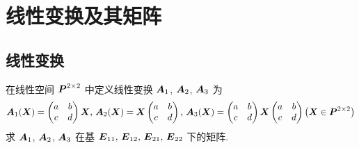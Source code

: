 \section{线性变换及其矩阵}

\subsection{线性变换}

\begin{example}
    在线性空间 $\vb*{P}^{2\times2}$ 中定义线性变换 $\vb*{A}_1$, $\vb*{A}_2$, $\vb*{A}_3$ 为
    $$\vb*{A}_1(\vb*{X})=\begin{pmatrix}
            a & b \\
            c & d
        \end{pmatrix}\vb*{X}\text{, }\vb*{A}_2(\vb*{X})=\vb*{X}\begin{pmatrix}
            a & b \\
            c & d
        \end{pmatrix}\text{, }\vb*{A}_3(\vb*{X})=\begin{pmatrix}
            a & b \\
            c & d
        \end{pmatrix}\vb*{X}\begin{pmatrix}
            a & b \\
            c & d
        \end{pmatrix}\qty(\vb*{X}\in \vb*{P}^{2\times2})$$
    求 $\vb*{A}_1$, $\vb*{A}_2$, $\vb*{A}_3$ 在基 $\vb*{E}_{11}\text{, }\vb*{E}_{12}\text{, }\vb*{E}_{21}\text{, }\vb*{E}_{22}$ 下的矩阵.
\end{example}
